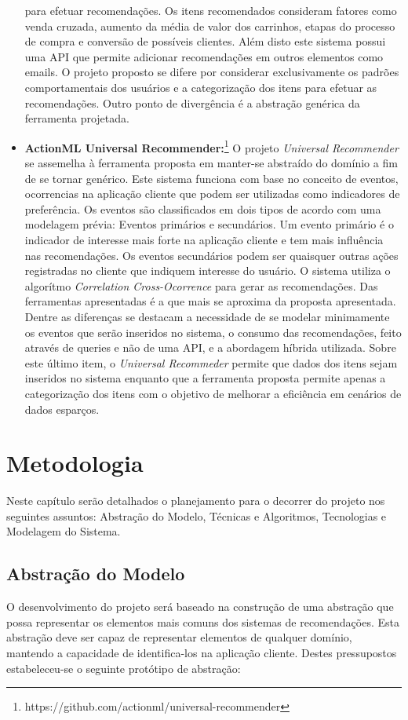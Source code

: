 \documentclass[
	12pt,				%
    oneside,			%
	a4paper,			%
	english,			%
	french,				%
	spanish,			%
	brazil,				%
	]{abntex2}
\begin{document}
\begin{itemize}
	para efetuar recomendações. Os itens recomendados consideram fatores como venda cruzada, aumento da média de valor dos carrinhos, etapas do processo de compra e conversão de possíveis clientes. Além disto 
	este sistema possui uma API que permite adicionar recomendações em outros elementos como emails. O projeto proposto se difere por considerar exclusivamente os padrões comportamentais dos usuários e a
	categorização dos itens para efetuar as recomendações. Outro ponto de divergência é a abstração genérica da ferramenta projetada. 
	\item \textbf{ActionML Universal Recommender:}\footnote{https://github.com/actionml/universal-recommender} O projeto \textit{Universal Recommender} se assemelha à ferramenta proposta em manter-se abstraído
	do domínio a fim de se tornar genérico. Este sistema funciona com base no conceito de eventos, ocorrencias na aplicação cliente que podem ser utilizadas como indicadores de preferência. Os eventos são
	classificados em dois tipos de acordo com uma modelagem prévia: Eventos primários e secundários. Um evento primário é o indicador de interesse mais forte na aplicação cliente e tem mais influência nas
	recomendações. Os eventos secundários podem ser quaisquer outras ações registradas no cliente que indiquem interesse do usuário. O sistema utiliza o algorítmo \textit{Correlation Cross-Ocorrence} para 
	gerar as recomendações. Das ferramentas apresentadas é a que mais se aproxima da proposta apresentada. Dentre as diferenças se destacam a necessidade de se modelar minimamente os eventos que serão inseridos
	no sistema, o consumo das recomendações, feito através de queries e não de uma API, e a abordagem híbrida utilizada. Sobre este último item, o \textit{Universal Recommeder} permite que dados dos itens sejam 
	inseridos no sistema enquanto que a ferramenta proposta permite apenas a categorização dos itens com o objetivo de melhorar a eficiência em cenários de dados esparços.
\end{itemize} 

\chapter{Metodologia}
Neste capítulo serão detalhados o planejamento para o decorrer do projeto nos seguintes assuntos: Abstração do Modelo, Técnicas e Algoritmos, Tecnologias e
Modelagem do Sistema.

\section{Abstração do Modelo}
O desenvolvimento do projeto será baseado na construção de uma abstração que possa representar os elementos mais comuns dos sistemas de recomendações.
Esta abstração deve ser capaz de representar elementos de qualquer domínio, mantendo a capacidade de identifica-los na aplicação cliente. Destes pressupostos estabeleceu-se o seguinte protótipo de abstração:
\end{document}
